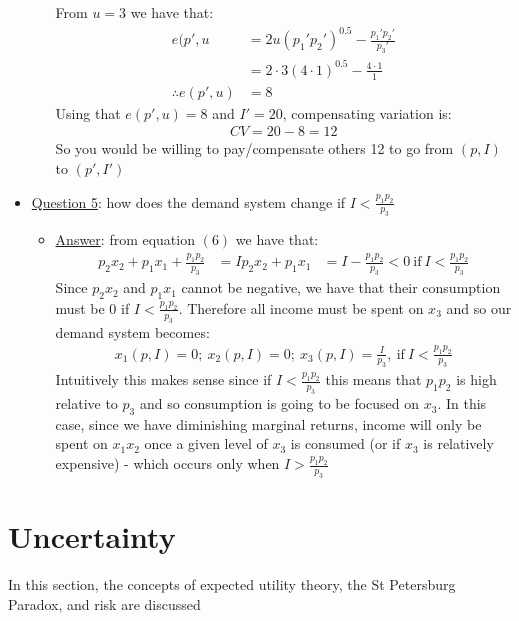 \documentclass{article}
\begin{document}
\begin{itemize}
\begin{itemize}
    From $u=3$ we have that:
    \begin{align*}
      e(p',u &= 2u(p_{1}'p_{2}')^{0.5} - \frac{p_{1}'p_{2}'}{p_{3}'} \\
      &= 2 \cdot 3 (4 \cdot 1)^{0.5} - \frac{4 \cdot 1}{1} \\
      \therefore e(p',u) &= 8
    \end{align*}
    Using that $e(p',u) = 8$ and $I' = 20$, compensating variation is:
    \begin{gather*}
      CV = 20 - 8 = 12
    \end{gather*}
    So you would be willing to pay/compensate others 12 to go from $(p,I)$ to $(p',I')$
  \end{itemize}
  \item  \underline{Question 5}: how does the demand system change if $I < \tfrac{p_{1}p_{2}}{p_{3}}$
  \begin{itemize}
    \item  \underline{Answer}: from equation $(6)$ we have that:
    \begin{align*}
      p_{2}x_{2} + p_{1}x_{1} + \frac{p_{1}p_{2}}{p_{3}} &= I
      p_{2}x_{2} + p_{1}x_{1} &= I - \frac{p_{1}p_{2}}{p_{3}} < 0  \ \text{if} \ I < \frac{p_{1}p_{2}}{p_{3}}
    \end{align*}
    Since $p_{2}x_{2}$ and $p_{1}x_{1}$ cannot be negative, we have that their consumption must be $0$ if $I < \tfrac{p_{1}p_{2}}{p_{3}}$. Therefore all income must be spent on $x_{3}$ and so our demand system becomes:
    \begin{gather*}
      x_{1}(p,I) = 0; \ x_{2}(p,I) = 0; \ x_{3}(p,I) = \frac{I}{p_{3}}, \ \text{if} \  I < \frac{p_{1}p_{2}}{p_{3}}
    \end{gather*}
    Intuitively this makes sense since if $I < \tfrac{p_{1}p_{2}}{p_{3}}$ this means that $p_{1}p_{2}$ is high relative to $p_{3}$ and so consumption is going to be focused on $x_{3}$. In this case, since we have diminishing marginal returns, income will only be spent on $x_{1}x_{2}$ once a given level of $x_{3}$ is consumed (or if $x_{3}$ is relatively expensive) - which occurs only when $I > \frac{p_{1}p_{2}}{p_{3}}$
  \end{itemize}
\end{itemize}

\newpage

\vspace{2.5mm}
\section{Uncertainty}
In this section, the concepts of expected utility theory, the St Petersburg Paradox, and risk are discussed \par
\vspace{6mm}
\end{document}
